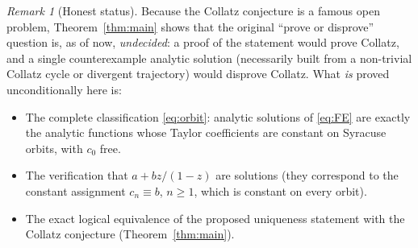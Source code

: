 \documentclass{amsart}
\theoremstyle{remark}
\newtheorem{remark}{Remark}
\begin{document}
\begin{remark}[Honest status]
Because the Collatz conjecture is a famous open problem, Theorem~\ref{thm:main} shows that the
original ``prove or disprove'' question is, as of now, \emph{undecided}: a proof of the statement
would prove Collatz, and a single counterexample analytic solution (necessarily built from a
non-trivial Collatz cycle or divergent trajectory) would disprove Collatz. What \emph{is} proved
unconditionally here is:
\begin{itemize}
\item The complete classification \eqref{eq:orbit}: analytic solutions of \eqref{eq:FE} are
exactly the analytic functions whose Taylor coefficients are constant on Syracuse orbits, with
$c_0$ free.
\item The verification that $a+bz/(1-z)$ are solutions (they correspond to the constant
assignment $c_n\equiv b$, $n\ge1$, which is constant on every orbit).
\item The exact logical equivalence of the proposed uniqueness statement with the Collatz
conjecture (Theorem~\ref{thm:main}).
\end{itemize}
\end{remark}
\end{document}
